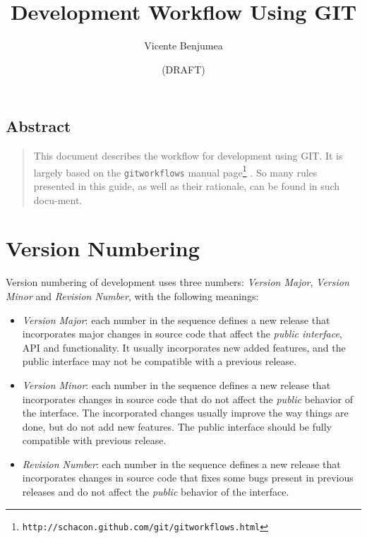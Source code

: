 \documentclass[a4paper]{article}
\title{Development Workflow Using GIT}
\author{Vicente Benjumea}
\date{(DRAFT)}
\begin{document}
\maketitle
\subsection*{Abstract}
\begin{quote}\small
This document describes the workflow for development using GIT. It is
largely based on the \verb|gitworkflows| manual
page\footnote{\texttt{http://schacon.github.com/git/gitworkflows.html}}
\cite{GW}. So many rules presented in this guide, as well as their
rationale, can be found in such docu-ment.
\end{quote}
\section{Version Numbering}
Version numbering of development uses three numbers: \emph{Version
  Major}, \emph{Version Minor} and \emph{Revision Number}, with the
following meanings: \par{\footnotesize\begin{itemize}%
\item \emph{Version Major}: each number in the sequence defines a new
  release that incorporates major changes in source code that affect
  the \emph{public interface}, API and functionality. It usually
  incorporates new added features, and the public interface may not be
  compatible with a previous release.
\item \emph{Version Minor}: each number in the sequence defines a new
  release that incorporates changes in source code that do not affect
  the \emph{public} behavior of the interface. The incorporated
  changes usually improve the way things are done, but do not add new
  features. The public interface should be fully compatible with
  previous release.
\item \emph{Revision Number}: each number in the sequence defines a
  new release that incorporates changes in source code that fixes some
  bugs present in previous releases and do not affect the
  \emph{public} behavior of the interface.
\end{itemize}}%
\end{document}
